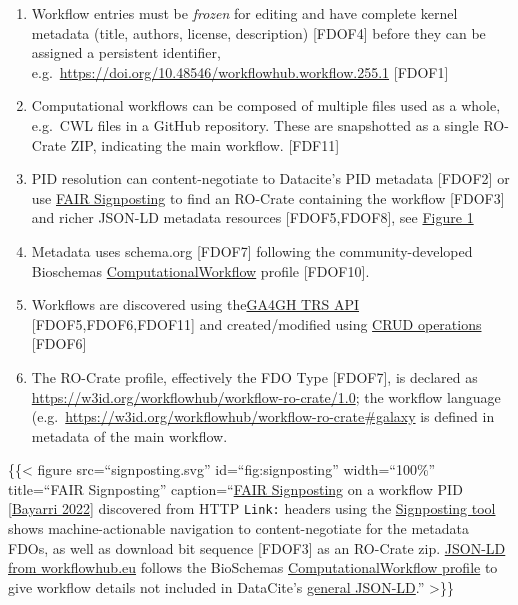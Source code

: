\begin{enumerate}
\def\labelenumi{\arabic{enumi}.}
\tightlist
\item
  Workflow entries must be \emph{frozen} for editing and have complete
  kernel metadata (title, authors, license, description) {[}FDOF4{]}
  before they can be assigned a persistent identifier,
  e.g.~\url{https://doi.org/10.48546/workflowhub.workflow.255.1}
  {[}FDOF1{]}
\item
  Computational workflows can be composed of multiple files used as a
  whole, e.g.~CWL files in a GitHub repository. These are snapshotted as
  a single RO-Crate ZIP, indicating the main workflow. {[}FDF11{]}
\item
  PID resolution can content-negotiate to Datacite's PID metadata
  {[}FDOF2{]} or use \href{https://signposting.org/FAIR/}{FAIR
  Signposting} to find an RO-Crate containing the workflow {[}FDOF3{]}
  and richer JSON-LD metadata resources {[}FDOF5,FDOF8{]}, see
  \protect\hyperlink{fig:signposting}{Figure 1}
\item
  Metadata uses schema.org {[}FDOF7{]} following the community-developed
  Bioschemas
  \href{https://bioschemas.org/profiles/ComputationalWorkflow/1.0-RELEASE}{ComputationalWorkflow}
  profile {[}FDOF10{]}.
\item
  Workflows are discovered using
  the\href{https://about.workflowhub.eu/developer/trs/}{GA4GH TRS API}
  {[}FDOF5,FDOF6,FDOF11{]} and created/modified using
  \href{https://workflowhub.eu/api}{CRUD operations} {[}FDOF6{]}
\item
  The RO-Crate profile, effectively the FDO Type {[}FDOF7{]}, is
  declared as \url{https://w3id.org/workflowhub/workflow-ro-crate/1.0};
  the workflow language
  (e.g.~\url{https://w3id.org/workflowhub/workflow-ro-crate\#galaxy} is
  defined in metadata of the main workflow.
\end{enumerate}

\{\{\textless{} figure src=``signposting.svg'' id=``fig:signposting''
width=``100\%'' title=``FAIR Signposting''
caption=``\href{https://signposting.org/FAIR/}{FAIR Signposting} on a
workflow PID
{[}\href{https://doi.org/10.48546/workflowhub.workflow.255.1}{Bayarri
2022}{]} discovered from HTTP \texttt{Link:} headers using the
\href{https://pypi.org/project/signposting/}{Signposting tool} shows
machine-actionable navigation to content-negotiate for the metadata
FDOs, as well as download bit sequence {[}FDOF3{]} as an RO-Crate zip.
\href{https://workflowhub.eu/workflows/255.jsonld}{JSON-LD from
workflowhub.eu} follows the BioSchemas
\href{https://bioschemas.org/profiles/ComputationalWorkflow/1.0-RELEASE}{ComputationalWorkflow
profile} to give workflow details not included in DataCite's
\href{https://data.crosscite.org/application/ld+json/10.48546/workflowhub.workflow.255.1}{general
JSON-LD}.'' \textgreater\}\}

